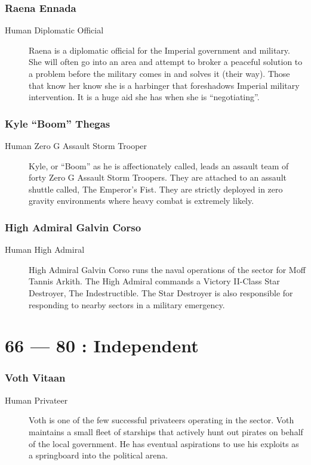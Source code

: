 \documentclass{article}
\begin{document}
\section{Raena Ennada}
\begin{description}
	\item [Human \female Diplomatic Official] Raena is a diplomatic official for the Imperial government and military. She will often go into an area and attempt to broker a peaceful solution to a problem before the military comes in and solves it (their way). Those that know her know she is a harbinger that foreshadows Imperial military intervention. It is a huge aid she has when she is “negotiating”.
\end{description}
\section{Kyle “Boom” Thegas}
\begin{description}
	\item [Human \male Zero G Assault Storm Trooper] Kyle, or “Boom” as he is affectionately called, leads an assault team of forty Zero G Assault Storm Troopers. They are attached to an assault shuttle called, The Emperor’s Fist. They are strictly deployed in zero gravity environments where heavy combat is extremely likely.
\end{description}
\section{High Admiral Galvin Corso}
\begin{description}
	\item [Human \male High Admiral] High Admiral Galvin Corso runs the naval operations of the sector for Moff Tannis Arkith. The High Admiral commands a Victory II-Class Star Destroyer, The Indestructible. The Star Destroyer is also responsible for responding to nearby sectors in a military emergency.
\end{description}

\part*{66 --- 80 : Independent}
\setcounter{section}{65}
\section{Voth Vitaan}
\begin{description}
	\item [Human \male Privateer] Voth is one of the few successful privateers operating in the sector. Voth maintains a small fleet of starships that actively hunt out pirates on behalf of the local government. He has eventual aspirations to use his exploits as a springboard into the political arena.
\end{description}
\end{document}
